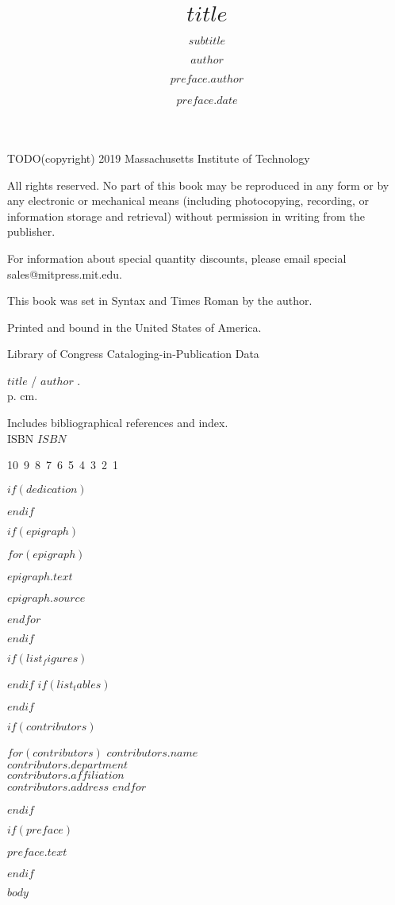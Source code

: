 \documentclass[$class_options$]{Linguistics}
\title{$title$}
\subtitle{$subtitle$}
\author{$author$}
\begin{document}
\halftitlepage

\titlepage

\begin{copyrightpage}

  TODO(copyright) 2019 Massachusetts Institute of Technology

	All rights reserved. No part of this book may be reproduced in
        any form or by any electronic or mechanical means (including
        photocopying, recording, or information storage and retrieval) without
        permission in writing from the publisher.

	For information about special quantity discounts, please email special sales@mitpress.mit.edu.

	This book was set in Syntax and Times Roman by the author.

	Printed and bound in the United States of America.

	Library of Congress Cataloging-in-Publication Data

	$title$ / $author$ .\\
	\hspace*{6pt} p. cm.

	Includes bibliographical references and index.\\
	ISBN $ISBN$
\vfill

10\ 9\ 8\ 7\ 6\ 5\ 4\ 3\ 2\ 1\

\end{copyrightpage}

$if(dedication)$
\dedication{$dedication$}
$endif$

$if(epigraph)$
  \begin{epigraphpage}
  $for(epigraph)$
    \epigraph{$epigraph.text$}{$epigraph.source$}
  $endfor$
  \end{epigraphpage}
$endif$

\tableofcontents
$if(list_figures)$\listoffigures$endif$
$if(list_tables)$\listoftables$endif$

$if(contributors)$
  \begin{contributors}
  $for(contributors)$
    \contrib
    $contributors.name$\\
    $contributors.department$\\
    $contributors.affiliation$\\
    $contributors.address$
  $endfor$
  \end{contributors}
$endif$

$if(preface)$
\begin{preface}
  $preface.text$
  \author{$preface.author$}
  \date{$preface.date$}
\end{preface}
$endif$

$body$

\endmatter



\end{document}
